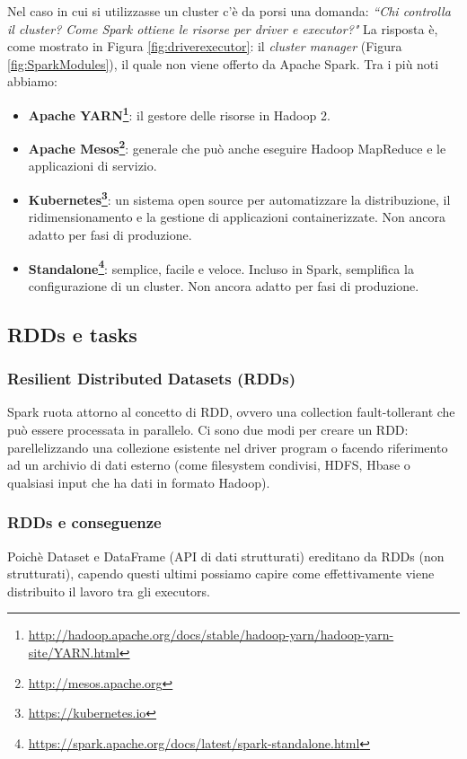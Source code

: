 \documentclass[12pt,italian]{article}
\begin{document}
\par Nel caso in cui si utilizzasse un cluster c'è da porsi una domanda: \textit{``Chi controlla il cluster? Come Spark ottiene le risorse per driver e executor?"}
\newline La risposta è, come mostrato in Figura \ref{fig:driverexecutor}: il \textit{cluster manager} (Figura \ref{fig:SparkModules}), il quale non viene offerto da Apache Spark. Tra i più noti abbiamo:
\begin{itemize}
	\item\textbf{Apache YARN\footnote{\url{http://hadoop.apache.org/docs/stable/hadoop-yarn/hadoop-yarn-site/YARN.html}}}: il gestore delle risorse in Hadoop 2.
	\item\textbf{Apache Mesos\footnote{\url{http://mesos.apache.org}}}: generale che può anche eseguire Hadoop MapReduce e le applicazioni di servizio.
	\item\textbf{Kubernetes\footnote{\url{https://kubernetes.io}}}: un sistema open source per automatizzare la distribuzione, il ridimensionamento e la gestione di applicazioni containerizzate. Non ancora adatto per fasi di produzione.
	\item\textbf{Standalone\footnote{\url{https://spark.apache.org/docs/latest/spark-standalone.html}}}: semplice, facile e veloce. Incluso in Spark, semplifica la configurazione di un cluster. Non ancora adatto per fasi di produzione. 
\end{itemize}

\subsection{RDDs  e tasks}
\subsubsection{Resilient Distributed Datasets (RDDs)}\label{sec:RDD}
Spark ruota attorno al concetto di RDD, ovvero una collection fault-tollerant che può essere processata in parallelo. Ci sono due modi per creare un RDD: parellelizzando una collezione esistente nel driver program o facendo riferimento ad un archivio di dati esterno (come filesystem condivisi, HDFS, Hbase o qualsiasi input che ha dati in formato Hadoop).

\subsubsection{RDDs e conseguenze}
Poichè Dataset e DataFrame (API di dati strutturati) ereditano da RDDs (non strutturati), capendo questi ultimi possiamo capire come effettivamente viene distribuito il lavoro tra gli executors.
\end{document}
